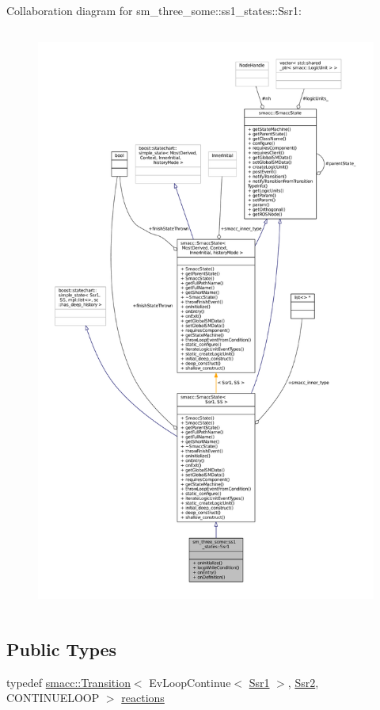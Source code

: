 Collaboration diagram for sm\+\_\+three\+\_\+some\+:\+:ss1\+\_\+states\+:\+:Ssr1\+:
\nopagebreak
\begin{figure}[H]
\begin{center}
\leavevmode
\includegraphics[height=550pt]{structsm__three__some_1_1ss1__states_1_1Ssr1__coll__graph}
\end{center}
\end{figure}
\subsection*{Public Types}
\begin{DoxyCompactItemize}
\item 
typedef \hyperlink{classsmacc_1_1Transition}{smacc\+::\+Transition}$<$ Ev\+Loop\+Continue$<$ \hyperlink{structsm__three__some_1_1ss1__states_1_1Ssr1}{Ssr1} $>$, \hyperlink{structsm__three__some_1_1ss1__states_1_1Ssr2}{Ssr2}, C\+O\+N\+T\+I\+N\+U\+E\+L\+O\+OP $>$ \hyperlink{structsm__three__some_1_1ss1__states_1_1Ssr1_a1585ded2cbbefc1883cef0ef4360ebb6}{reactions}
\end{DoxyCompactItemize}
